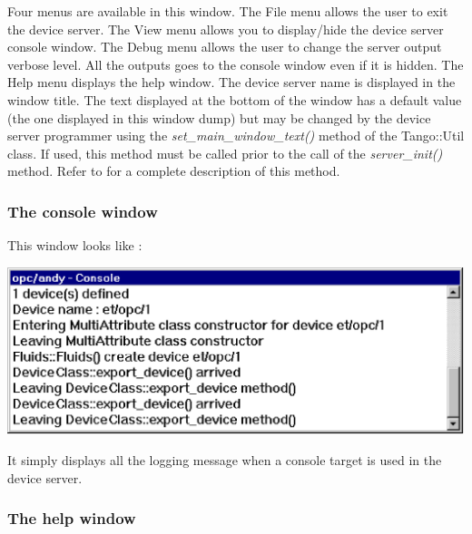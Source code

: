 \vspace{0.3cm}

Four menus are available in this window. The File menu allows the
user to exit the device server. The View menu allows you to display/hide
the device server console window. The Debug menu allows the user to
change the server output verbose level. All the outputs
goes to the console window even if it is hidden. The Help menu displays
the help window. The device server name is displayed in the window
title. The text displayed at the bottom of the window has a default
value (the one displayed in this window dump) but may be changed by
the device server programmer using the \emph{set\_main\_window\_text()}
method of the Tango::Util class. If used, this method must be called
prior to the call of the \emph{server\_init()}
method. Refer to \cite{TANGO_ref_man} for a complete description
of this method.

\subsubsection{The console window}

This window looks like :

\vspace{0.3cm}

\begin{center}
\includegraphics[width=14cm]{ds_writing/nt_server/cons}
\par\end{center}

\vspace{0.3cm}

It simply displays all the logging\emph{} message
when a console target is used in the device server. 

\subsubsection{The help window}

